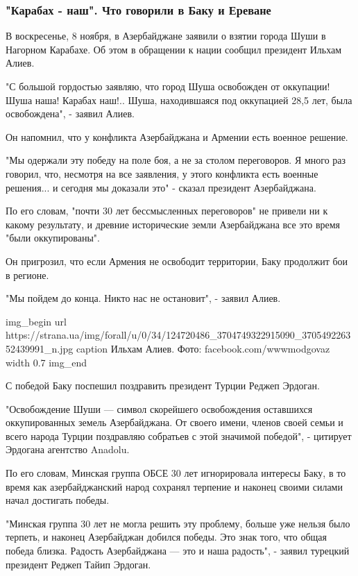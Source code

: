 \subsubsection{"Карабах - наш". Что говорили в Баку и Ереване}

В воскресенье, 8 ноября, в Азербайджане заявили о взятии города Шуши в Нагорном
Карабахе. Об этом в обращении к нации сообщил президент Ильхам Алиев.

"С большой гордостью заявляю, что город Шуша освобожден от оккупации! Шуша
наша! Карабах наш!.. Шуша, находившаяся под оккупацией 28,5 лет, была
освобождена", - заявил Алиев.

Он напомнил, что у конфликта Азербайджана и Армении есть военное решение.

"Мы одержали эту победу на поле боя, а не за столом переговоров. Я много раз
говорил, что, несмотря на все заявления, у этого конфликта есть военные
решения... и сегодня мы доказали это" - сказал президент Азербайджана.

По его словам, "почти 30 лет бессмысленных переговоров" не привели ни к какому
результату, и древние исторические земли Азербайджана все это время "были
оккупированы".

Он пригрозил, что если Армения не освободит территории, Баку продолжит бои в
регионе.

"Мы пойдем до конца. Никто нас не остановит", - заявил Алиев.

\ifcmt
img_begin 
	url https://strana.ua/img/forall/u/0/34/124720486_3704749322915090_370549226352439991_n.jpg
	caption Ильхам Алиев. Фото: facebook.com/wwwmodgovaz
	width 0.7
img_end
\fi

С победой Баку поспешил поздравить президент Турции Реджеп Эрдоган.

"Освобождение Шуши --- символ скорейшего освобождения оставшихся оккупированных
земель Азербайджана. От своего имени, членов своей семьи и всего народа Турции
поздравляю собратьев с этой значимой победой", - цитирует Эрдогана агентство
Anadolu.

По его словам, Минская группа ОБСЕ 30 лет игнорировала интересы Баку, в то
время как азербайджанский народ сохранял терпение и наконец своими силами начал
достигать победы.

"Минская группа 30 лет не могла решить эту проблему, больше уже нельзя было
терпеть, и наконец Азербайджан добился победы. Это знак того, что общая победа
близка. Радость Азербайджана --- это и наша радость", - заявил турецкий президент
Реджеп Тайип Эрдоган.

